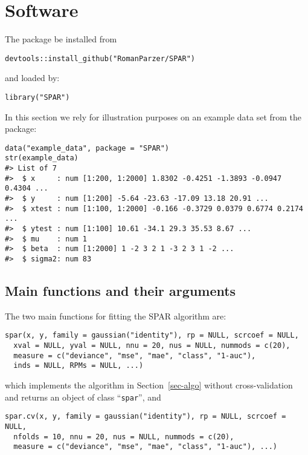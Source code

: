 \documentclass[
  article]{jss}
\begin{document}
\section{Software}\label{sec-software}

The package be installed from 

\begin{verbatim}
devtools::install_github("RomanParzer/SPAR")
\end{verbatim}

and loaded by:

\begin{verbatim}
library("SPAR")
\end{verbatim}

In this section we rely for illustration purposes on an example data set
from the package:

\begin{verbatim}
data("example_data", package = "SPAR")
str(example_data)
#> List of 7
#>  $ x     : num [1:200, 1:2000] 1.8302 -0.4251 -1.3893 -0.0947 0.4304 ...
#>  $ y     : num [1:200] -5.64 -23.63 -17.09 13.18 20.91 ...
#>  $ xtest : num [1:100, 1:2000] -0.166 -0.3729 0.0379 0.6774 0.2174 ...
#>  $ ytest : num [1:100] 10.61 -34.1 29.3 35.53 8.67 ...
#>  $ mu    : num 1
#>  $ beta  : num [1:2000] 1 -2 3 2 1 -3 2 3 1 -2 ...
#>  $ sigma2: num 83
\end{verbatim}

\subsection{Main functions and their
arguments}\label{main-functions-and-their-arguments}

The two main functions for fitting the SPAR algorithm are:

\begin{verbatim}
spar(x, y, family = gaussian("identity"), rp = NULL, scrcoef = NULL,
  xval = NULL, yval = NULL, nnu = 20, nus = NULL, nummods = c(20),
  measure = c("deviance", "mse", "mae", "class", "1-auc"),
  inds = NULL, RPMs = NULL, ...)
\end{verbatim}

which implements the algorithm in Section~\ref{sec-algo} without
cross-validation and returns an object of class ``\texttt{spar}'', and

\begin{verbatim}
spar.cv(x, y, family = gaussian("identity"), rp = NULL, scrcoef = NULL,
  nfolds = 10, nnu = 20, nus = NULL, nummods = c(20),
  measure = c("deviance", "mse", "mae", "class", "1-auc"), ...)
\end{verbatim}
\end{document}
